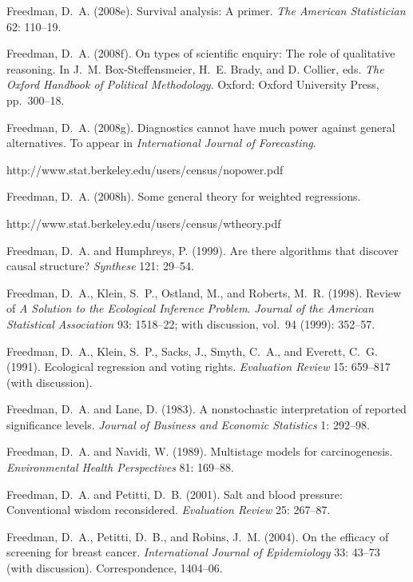 \smallskip\noindent
Freedman, D.~A. (2008e).
Survival analysis: A primer.
{\it The American Statistician\/} 62: 110--19.

\smallskip\noindent
Freedman, D.~A. (2008f).
On types of scientific enquiry: The role of qualitative reasoning.
In J.~M. Box-Steffensmeier, H.~E. Brady, and D. Collier, eds.
{\it The Oxford Handbook of Political Methodology\/}.
Oxford: Oxford University Press, pp.~300--18.

\smallskip\noindent
Freedman, D.~A. (2008g).
Diagnostics cannot have much power against general alternatives.
To appear in {\it International Journal of Forecasting\/}.

\noindent\hskip 10pt
http://www.stat.berkeley.edu/users/census/nopower.pdf

\smallskip\noindent
Freedman, D.~A. (2008h).
Some general theory for weighted regressions.

\noindent\hskip 10pt
http://www.stat.berkeley.edu/users/census/wtheory.pdf

\smallskip\noindent
Freedman, D.~A. and Humphreys, P. (1999).
Are there algorithms that discover causal structure?
{\it Synthese\/} 121: 29--54.

\smallskip\noindent
Freedman, D.~A., Klein, S.~P., Ostland, M., and Roberts, M.~R. (1998).
Review of {\it A Solution to the Ecological Inference Problem\/}.
{\it Journal of the American Statistical Association\/} 93: 1518--22;
with discussion, vol.~94 (1999): 352--57.

\smallskip\noindent
Freedman, D.~A., Klein, S.~P., Sacks, J., Smyth, C.~A., and Everett, C.~G. (1991).
Ecological regression and voting rights.
{\it Evaluation Review\/} 15: 659--817 (with discussion).

\smallskip\noindent
Freedman, D.~A. and Lane, D. (1983).
A nonstochastic interpretation of reported significance levels.
{\it Journal of Business and Economic Statistics\/} 1: 292--98.

\smallskip\noindent
Freedman, D.~A. and Navidi, W. (1989).
Multistage models for carcinogenesis.
{\it Environmental Health Perspectives\/} 81: 169--88.

\smallskip\noindent
Freedman, D.~A. and Petitti, D.~B. (2001).
Salt and blood pressure: Conventional wisdom reconsidered.
{\it Evaluation Review\/} 25: 267--87.

\smallskip\noindent
Freedman, D.~A.,  Petitti, D.~B., and Robins, J.~M. (2004).
On the efficacy of screening for breast cancer.
{\it International Journal of Epidemiology\/} 33: 43--73 (with discussion).
Correspondence, 1404--06.

